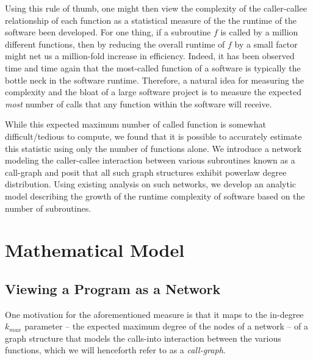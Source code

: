 \documentclass[11pt,a4paper,twocolumn]{article}
\begin{document}
\begin{singlespace}
Using this rule of thumb, one might then view the complexity of the caller-callee
relationship of each function as a statistical measure of the the runtime of the 
software been developed. For one thing, if a subroutine $f$ is called by a million 
different functions, then by reducing the overall runtime of $f$ by a small factor 
might net us a million-fold increase in efficiency. Indeed, it has been observed
time and time again \cite{something} that the most-called function of a software 
is typically the bottle neck in the software runtime. Therefore, a natural idea for
measuring the complexity and the bloat of a large software project is to measure 
the expected \emph{most} number of calls that any function within the software 
will receive.

While this expected maximum number of called function is somewhat difficult/tedious
to compute, we found that it is possible to accurately
estimate this statistic using only the number of functions alone. We introduce a 
network modeling the caller-callee interaction between various subroutines known
as a call-graph and posit that all such graph structures exhibit powerlaw degree 
distribution. Using existing analysis on such networks, we develop an analytic 
model describing the growth of the runtime complexity of software based on the
number of subroutines.


\section{Mathematical Model}
\subsection{Viewing a Program as a Network}
One motivation for the aforementioned measure is that it maps to the in-degree
$k_{max}$ parameter -- the expected maximum degree of the nodes of a network --
of a graph structure that models the calls-into interaction between the various
functions, which we will henceforth refer to as a \emph{call-graph}.


\end{singlespace}
\end{document}
